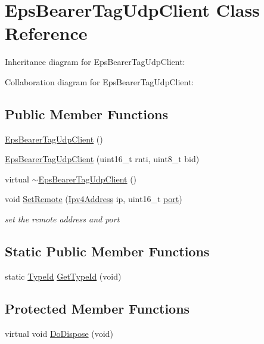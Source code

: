 \hypertarget{classEpsBearerTagUdpClient}{}\section{Eps\+Bearer\+Tag\+Udp\+Client Class Reference}
\label{classEpsBearerTagUdpClient}


Inheritance diagram for Eps\+Bearer\+Tag\+Udp\+Client\+:


Collaboration diagram for Eps\+Bearer\+Tag\+Udp\+Client\+:
\subsection*{Public Member Functions}
\begin{DoxyCompactItemize}
\item 
\hyperlink{classEpsBearerTagUdpClient_addffe0c4fc9e821a25825fa02b0c4ef2}{Eps\+Bearer\+Tag\+Udp\+Client} ()
\item 
\hyperlink{classEpsBearerTagUdpClient_a4735224725bb519825b10c13ed6637ff}{Eps\+Bearer\+Tag\+Udp\+Client} (uint16\+\_\+t rnti, uint8\+\_\+t bid)
\item 
virtual \hyperlink{classEpsBearerTagUdpClient_a06128beff6a0fde638c3949103d41568}{$\sim$\+Eps\+Bearer\+Tag\+Udp\+Client} ()
\item 
void \hyperlink{classEpsBearerTagUdpClient_a1790d158615784508371a7c0e8ce116c}{Set\+Remote} (\hyperlink{classns3_1_1Ipv4Address}{Ipv4\+Address} ip, uint16\+\_\+t \hyperlink{visualizer-ideas_8txt_a21ff1c530daf8435e00048b7fc2c58e3}{port})
\begin{DoxyCompactList}\small\item\em set the remote address and port \end{DoxyCompactList}\end{DoxyCompactItemize}
\subsection*{Static Public Member Functions}
\begin{DoxyCompactItemize}
\item 
static \hyperlink{classns3_1_1TypeId}{Type\+Id} \hyperlink{classEpsBearerTagUdpClient_a4b4038ae1347840a86bf3658d91394e7}{Get\+Type\+Id} (void)
\end{DoxyCompactItemize}
\subsection*{Protected Member Functions}
\begin{DoxyCompactItemize}
\item 
virtual void \hyperlink{classEpsBearerTagUdpClient_acb9d12aa9b3f0baa4e16eabd92619e6a}{Do\+Dispose} (void)
\end{DoxyCompactItemize}
